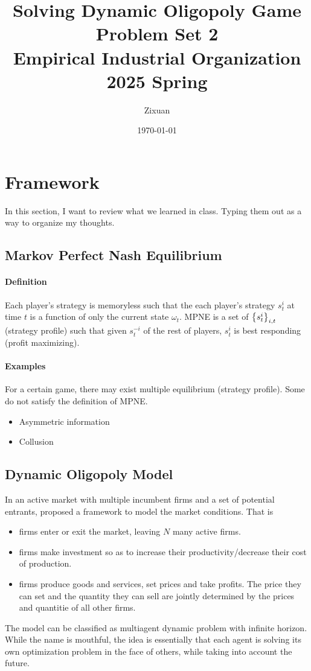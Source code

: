 \documentclass[12pt]{article}[margin=1in]
\title{\textbf{Solving Dynamic Oligopoly Game} \\
    \vspace{.3cm}
    \large Problem Set 2 \\
    Empirical Industrial Organization 2025 Spring}
\author{Zixuan}
\date{\today}
\begin{document}
\maketitle

\setcounter{page}{1}

\section{Framework}
In this section, I want to review what we learned in class. Typing them out as a way to organize my thoughts.
\subsection{Markov Perfect Nash Equilibrium}
\paragraph{Definition}
Each player's strategy is memoryless such that the each player's strategy $s_t^i$ at time $t$ is a function of only the current state $\omega_t$.
MPNE is a set of $\left\{s_t^i\right\}_{i,t}$ (strategy profile) such that given $s_t^{-i}$ of the rest of players, $s_t^i$ is best responding (profit maximizing).
\paragraph{Examples}
For a certain game, there may exist multiple equilibrium (strategy profile). Some do not satisfy the definition of MPNE.
\begin{itemize}
    \item Asymmetric information 
    \item Collusion
\end{itemize}

\subsection{Dynamic Oligopoly Model}
In an active market with multiple incumbent firms and a set of potential entrants, \citet{ericson1995markov} proposed a framework to model the market conditions. That is
\begin{itemize}
    \item firms enter or exit the market, leaving $N$ many active firms.
    \item firms make investment so as to increase their productivity/decrease their cost of production.
    \item firms produce goods and services, set prices and take profits. The price they can set and the quantity they can sell are jointly determined by the prices and quantitie of all other firms.
\end{itemize} 
The model can be classified as multiagent dynamic problem with infinite horizon. While the name is mouthful, the idea is essentially that each agent is solving its own optimization problem in the face of others, while taking into account the future. 
\end{document}
